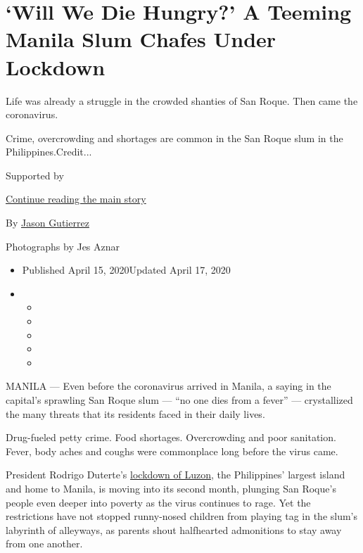 \hypertarget{will-we-die-hungry-a-teeming-manila-slum-chafes-under-lockdown}{%
\section{`Will We Die Hungry?' A Teeming Manila Slum Chafes Under
Lockdown}\label{will-we-die-hungry-a-teeming-manila-slum-chafes-under-lockdown}}

Life was already a struggle in the crowded shanties of San Roque. Then
came the coronavirus.

Crime, overcrowding and shortages are common in the San Roque slum in
the Philippines.Credit...

Supported by

\protect\hyperlink{after-sponsor}{Continue reading the main story}

By \href{https://www.nytimes3xbfgragh.onion/by/jason-gutierrez}{Jason
Gutierrez}

Photographs by Jes Aznar

\begin{itemize}
\item
  Published April 15, 2020Updated April 17, 2020
\item
  \begin{itemize}
  \item
  \item
  \item
  \item
  \item
  \end{itemize}
\end{itemize}

MANILA --- Even before the coronavirus arrived in Manila, a saying in
the capital's sprawling San Roque slum --- ``no one dies from a fever''
--- crystallized the many threats that its residents faced in their
daily lives.

Drug-fueled petty crime. Food shortages. Overcrowding and poor
sanitation. Fever, body aches and coughs were commonplace long before
the virus came.

President Rodrigo Duterte's
\href{https://www.rappler.com/nation/256432-duterte-extends-luzon-lockdown-april-30-2020-coronavirus-pandemic}{lockdown
of Luzon}, the Philippines' largest island and home to Manila, is moving
into its second month, plunging San Roque's people even deeper into
poverty as the virus continues to rage. Yet the restrictions have not
stopped runny-nosed children from playing tag in the slum's labyrinth of
alleyways, as parents shout halfhearted admonitions to stay away from
one another.

